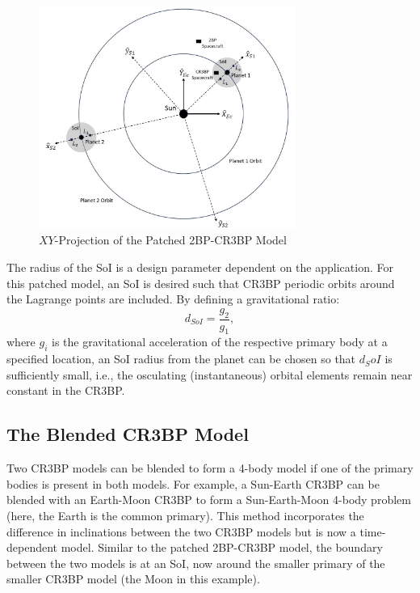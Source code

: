 \begin{figure}[ht]
    \centering
    \includegraphics[width=0.75\textwidth]{figures/TBP-CR3BP.jpg}
    \caption{$XY$-Projection of the Patched 2BP-CR3BP Model}
    \label{fig:2BP-CR3BP}
\end{figure}

The radius of the SoI is a design parameter dependent on the application. For this patched model,
an SoI is desired such that CR3BP periodic orbits around the Lagrange points are included. By
defining a gravitational ratio:
\begin{equation}
    d_{SoI}=\frac{g_{2}}{g_{1}},
    \label{eq:patchedSoI}
\end{equation}
where $g_{i}$ is the gravitational acceleration of the respective primary body at a specified
location, an SoI radius from the planet can be chosen so that $d_SoI$ is sufficiently small, i.e.,
the osculating (instantaneous) orbital elements remain near constant in the
CR3BP\cite{Canales:2021b}.

\subsection{The Blended CR3BP Model}
Two CR3BP models can be blended to form a 4-body model if one of the primary bodies is present in
both models. For example, a Sun-Earth CR3BP can be blended with an Earth-Moon CR3BP to form a
Sun-Earth-Moon 4-body problem (here, the Earth is the common primary). This method incorporates the
difference in inclinations between the two CR3BP models but is now a time-dependent
model\cite{Kakoi:2014}. Similar to the patched 2BP-CR3BP model, the boundary between the two models
is at an SoI, now around the smaller primary of the smaller CR3BP model (the Moon in this example).

